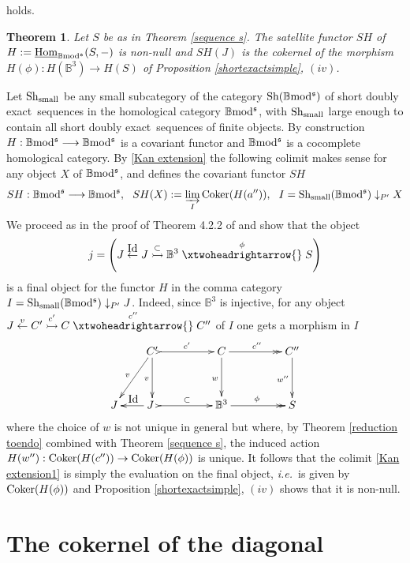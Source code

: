 \documentclass[12pt]{article}
\newtheorem{thm}{Theorem}[section]
\def\Homi{{\underline{\rm Hom}}}
\def\id{{\rm id}}
\def\coker{{\rm Coker}}
\def\B{{\mathbb B}}
\def\exxx{{doubly exact}~}
\newcommand{\ie}{{\it i.e.\/}\ }
\def\id{{\mbox{Id}}}
\def\sequ{{\rm Sh}}
\def\b2{{\rm \B mod^{\mathfrak s}}}
\begin{document}
 holds. \endproof 
 \begin{thm}\label{reduction toendo cor1} Let $S$ be as in Theorem \ref{sequence s}. The satellite functor $SH$ of  $H:=\Homi_\b2(S,-)$ is non-null and $SH(J)$  is the cokernel of the morphism $H(\phi):H(\B^3)\to H(S)$ of Proposition \ref{shortexactsimple}, $(iv)$.\end{thm}
\proof  Let $\sequ_{\rm small}$ be any small subcategory of the category $\sequ(\b2)$ of short \exxx sequences in the homological category $\b2$, with $\sequ_{\rm small}$  large enough to contain all short \exxx sequences of finite objects. By construction  $H:\b2\longrightarrow \b2$ is a covariant functor and $\b2$ is  a cocomplete  homological category. By \eqref{Kan extension} the following colimit makes sense for any object $X$ of $\b2$, and defines the  covariant functor $SH$
 \begin{equation}\label{Kan extension1}
	SH:\b2\longrightarrow \b2, \ \ SH(X):=\varinjlim_I \coker(H(a'')), \ \ I=\sequ_{\rm small}(\b2)\downarrow_{P'} X
\end{equation} 
We proceed as in the proof of Theorem 4.2.2 of \cite{gra1} and show that the object $$j=\left(J\stackrel{\id}{\leftarrow} J\stackrel{\subset}{\rightarrowtail}\B^3\stackrel{\phi}{\xtwoheadrightarrow{}}S\right)$$
is a  final object for the functor $H$ in the comma  category $I=\sequ_{\rm small}(\b2)\downarrow_{P'} J$. Indeed, since  $\B^3$ is injective, for any object $J\stackrel{v}{\leftarrow} C'\stackrel{c'}{\rightarrowtail}C\stackrel{c''}{\xtwoheadrightarrow{}}C''$ of $I$ one gets 
  a morphism in $I$
\begin{equation}\label{colimit compatib}
\xymatrix@C=20pt@R=35pt{
&  C' \ar[ld]_{v}\ar[d]_{v}\ar@{>->}[rr]^{c'} && C\ar[d]_{w} \ar@{->>}[rr]^{c''}&& C''\ar[d]_{w''}
\\
J & \ar[l]_{\id}J \ \ar@{>->}[rr]^{\subset}&& \B^3 \ar@{->>}[rr]^{\phi}&& S }
\end{equation}
where the choice of $w$ is not unique in general but where, by Theorem \ref{reduction toendo} combined with Theorem \ref{sequence s}, the induced action $H(w''): \coker(H(c''))\to \coker(H(\phi))$ is unique. It follows that the colimit \eqref{Kan extension1} is simply the evaluation on the final object, \ie is given by $\coker(H(\phi))$ and Proposition \ref{shortexactsimple}, $(iv)$ shows that it is non-null. \endproof 

 \section{The cokernel of the diagonal}\label{sectcokerdiag}
 
\end{document}
